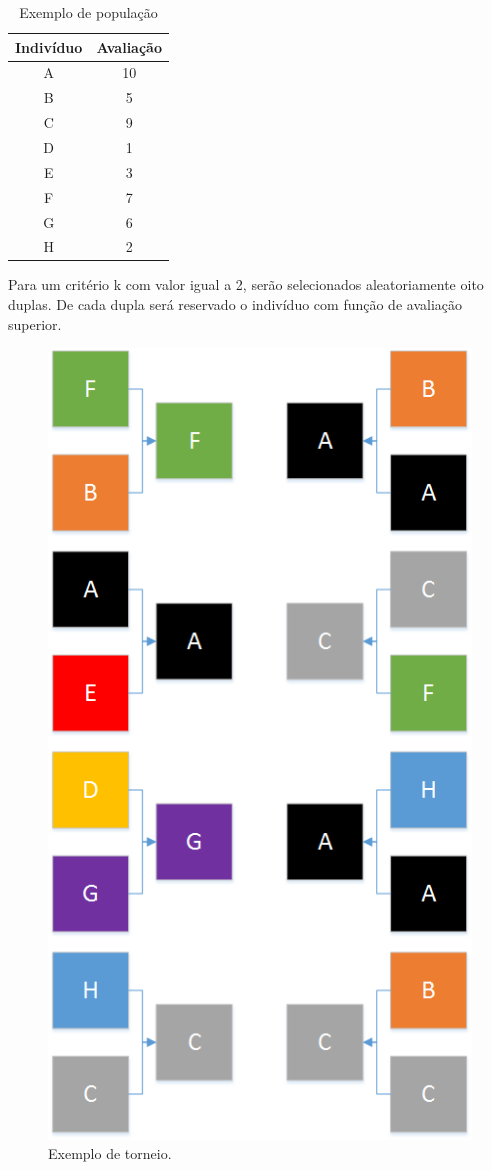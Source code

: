 \documentclass[twoside]{article}
\begin{document}
\begin{multicols}{2}
\begin{table}[H]
\label{tab:popinfo}
\caption{Exemplo de população}
\centering
\begin{tabular}{cc}
\toprule
Indivíduo & Avaliação\\
\midrule
A & 10\\
B & 5\\
C & 9\\
D & 1\\
E & 3\\
F & 7\\
G & 6\\
H & 2\\
\bottomrule
\end{tabular}
\end{table}

Para um critério k com valor igual a 2, serão selecionados aleatoriamente oito duplas. De cada dupla será reservado o indivíduo com função de avaliação superior.

\begin{figure}[H]
\label{fig:torneio}
  \caption{Exemplo de torneio.}
  \centering
    \includegraphics[scale = 0.5]{torneio.png}
\end{figure}


\end{multicols}
\end{document}
